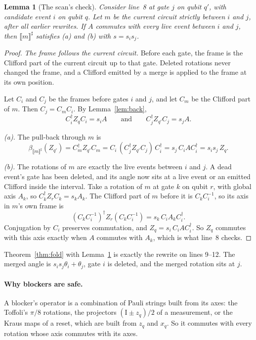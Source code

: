 \documentclass[11pt]{article}
\newtheorem{lemma}[theorem]{Lemma}
\theoremstyle{definition}
\theoremstyle{remark}
\newcommand{\abs}[1]{\llbracket #1 \rrbracket^{\sharp}}
\newcommand{\adj}{^{\dagger}}
\newcommand{\back}{\beta}
\newcommand{\tI}{\mathrm{I}}
\begin{document}
\begin{lemma}[The scan's check]\label{lem:scan-check}
Consider line~8 at gate $j$ on qubit $q'$, with candidate event $i$ on qubit $q$. Let $m$ be
the current circuit strictly between $i$ and $j$, after all earlier rewrites. If $A$
commutes with every live event between $i$ and $j$, then $\abs{m}$ satisfies (a) and (b) with
$s = s_i s_j$.
\end{lemma}

\begin{proof}
\emph{The frame follows the current circuit.} Before each gate, the frame is the Clifford
part of the current circuit up to that gate. Deleted rotations never changed the frame, and
a Clifford emitted by a merge is applied to the frame at its own position.

Let $C_i$ and $C_j$ be the frames before gates $i$ and $j$, and let $C_m$ be the Clifford part
of $m$. Then $C_j = C_m C_i$. By Lemma~\ref{lem:back},
\[
  C_i\adj Z_q C_i = s_i A \qquad\text{and}\qquad C_j\adj Z_{q'} C_j = s_j A .
\]

\emph{(a).} The pull-back through $m$ is
\[
  \back_{\abs{m}}(Z_{q'}) = C_m\adj Z_{q'} C_m = C_i\,(C_j\adj Z_{q'} C_j)\,C_i\adj
  = s_j\, C_i A C_i\adj = s_i s_j\, Z_q .
\]

\emph{(b).} The rotations of $m$ are exactly the live events between $i$ and $j$. A dead
event's gate has been deleted, and its angle now sits at a live event or an emitted Clifford
inside the interval. Take a rotation of $m$ at gate $k$ on qubit $r$, with global axis
$A_k$, so $C_k\adj Z_r C_k = s_k A_k$. The Clifford part of $m$ before it is
$C_k C_i^{-1}$, so its axis in $m$'s own frame is
\[
  (C_k C_i^{-1})\adj Z_r (C_k C_i^{-1}) = s_k\, C_i A_k C_i\adj .
\]
Conjugation by $C_i$ preserves commutation, and $Z_q = s_i\, C_i A C_i\adj$. So $Z_q$
commutes with this axis exactly when $A$ commutes with $A_k$, which is what line~8
checks.
\end{proof}

Theorem~\ref{thm:fold} with Lemma~\ref{lem:scan-check} is exactly the rewrite on
lines 9--12. The merged angle is $s_i s_j\theta_i + \theta_j$, gate $i$ is deleted, and the
merged rotation sits at $j$.

\paragraph{Why blockers are safe.}
A blocker's operator is a combination of Pauli strings built from its axes: the Toffoli's
$\pi/8$ rotations, the projectors $(\tI\pm z_q)/2$ of a measurement, or the Kraus maps of
a reset, which are built from $z_q$ and $x_q$. So it commutes with every rotation whose axis
commutes with its axes.
\end{document}
